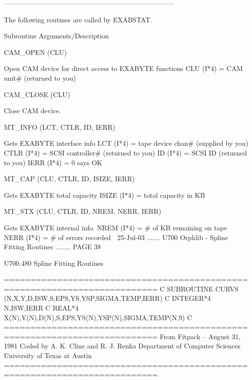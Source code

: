   ---------------------------------------------------------------------------
 
   The following routines are called by EXABSTAT.
 
   Subroutine          Arguments/Description
 
   CAM_OPEN           (CLU)
 
                       Open CAM device for direct access to EXABYTE functions
                       CLU (I*4)   = CAM  unit# (returned to you)
 
   CAM_CLOSE          (CLU)
 
                       Close CAM device.
 
   MT_INFO            (LCT, CTLR, ID, IERR)
 
                       Gets EXABYTE interface info
                       LCT  (I*4) = tape device chan# (supplied by you)
                       CTLR (I*4) = SCSI controller#  (returned to you)
                       ID   (I*4) = SCSI ID           (returned to you)
                       IERR (I*4) = 0 says OK
 
   MT_CAP             (CLU, CTLR, ID, ISIZE, IERR)
 
                       Gets EXABYTE total capacity
                       ISIZE (I*4) = total capacity in KB
 
   MT_STX             (CLU, CTLR, ID, NREM, NERR, IERR)
 
                       Gets EXABYTE internal info.
                       NREM (I*4)  = # of KB remaining on tape
                       NERR (I*4)  = # of errors recorded
    
   25-Jul-03 ....... U700  Orphlib - Spline Fitting Routines ........ PAGE  38
 
 
 
   U700.480  Spline Fitting Routines
 
   ===========================================================================
   C
         SUBROUTINE CURVS (N,X,Y,D,ISW,S,EPS,YS,YSP,SIGMA,TEMP,IERR)
   C
         INTEGER*4  N,ISW,IERR
   C
         REAL*4     X(N),Y(N),D(N),S,EPS,YS(N),YSP(N),SIGMA,TEMP(N,9)
   C
   ===========================================================================
   From Fitpack -- August 31, 1981
   Coded by A. K. Cline and R. J. Renka
   Department of Computer Sciences
   University of Texas at Austin
   ===========================================================================
 
